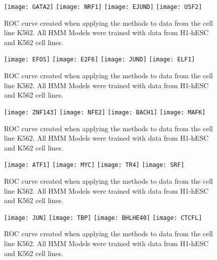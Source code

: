 \documentclass[11pt,a4]{article}
\begin{document}
\begin{figure}[h]
\centering
    \texttt{[image: GATA2]}
    \texttt{[image: NRF1]}
    \texttt{[image: EJUND]}
    \texttt{[image: USF2]}
\caption{ROC curve created when applying the methods to data from the cell line K562. All HMM Models were trained with data from H1-hESC and K562 cell lines.}
\label{fig:roc.K562.6}
\end{figure}

\begin{figure}[h]
\centering
    \texttt{[image: EFOS]}
    \texttt{[image: E2F6]}
    \texttt{[image: JUND]}
    \texttt{[image: ELF1]}
\caption{ROC curve created when applying the methods to data from the cell line K562. All HMM Models were trained with data from H1-hESC and K562 cell lines.}
\label{fig:roc.K562.7}
\end{figure}

\begin{figure}[h]
\centering
    \texttt{[image: ZNF143]}
    \texttt{[image: NFE2]}
    \texttt{[image: BACH1]}
    \texttt{[image: MAFK]}
\caption{ROC curve created when applying the methods to data from the cell line K562. All HMM Models were trained with data from H1-hESC and K562 cell lines.}
\label{fig:roc.K562.8}
\end{figure}

\begin{figure}[h]
\centering
    \texttt{[image: ATF1]}
    \texttt{[image: MYC]}
    \texttt{[image: TR4]}
    \texttt{[image: SRF]}
\caption{ROC curve created when applying the methods to data from the cell line K562. All HMM Models were trained with data from H1-hESC and K562 cell lines.}
\label{fig:roc.K562.9}
\end{figure}

\begin{figure}[h]
\centering
    \texttt{[image: JUN]}
    \texttt{[image: TBP]}
    \texttt{[image: BHLHE40]}
    \texttt{[image: CTCFL]}
\caption{ROC curve created when applying the methods to data from the cell line K562. All HMM Models were trained with data from H1-hESC and K562 cell lines.}
\label{fig:roc.K562.10}
\end{figure}
\end{document}

